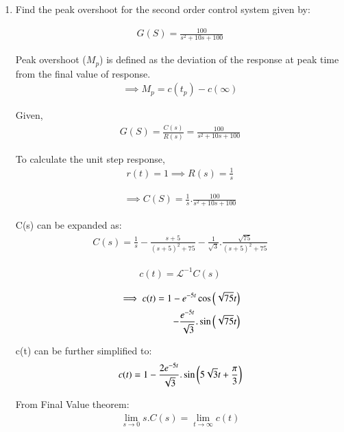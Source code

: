 \begin{enumerate}[label=\thesubsection.\arabic*.,ref=\thesubsection.\theenumi]

\item Find the peak overshoot for the second order control system given by:

\begin{align}
    G(S) = \frac{100}{s^2 + 10s +100}
\end{align}

\solution
Peak overshoot ($M_p$) is defined as the deviation of the response at peak time from the final value of response.
\begin{align}
    \implies M_p = c(t_p) - c(\infty)
    \label{eq:eebtech11045_Mp}
\end{align}

Given,
\begin{align}
    G(S) = \frac{C(s)}{R(s)} = \frac{100}{s^2 + 10s +100}
\end{align}

To calculate the unit step response,
\begin{align}
    r(t) = 1 \implies R(s) = \frac{1}{s}    
\end{align}

\begin{align}
    \implies C(S) = \frac{1}{s}.\frac{100}{s^2 + 10s +100}
\end{align}

C(s) can be expanded as:
\begin{align}
    C(s) = \frac{1}{s} - \frac{s+5}{(s+5)^2 + 75} - \frac{1}{\sqrt{3}}.\frac{\sqrt{75}}{(s+5)^2 + 75}
\end{align}

\begin{align}
    c(t) = \mathcal{L}^{-1}{C(s)}
\end{align}

\begin{align}
    \implies c(t) = 1 - e^{-5t}\cos\left(\sqrt{75}t\right) \\ - \frac{e^{-5t}}{\sqrt{3}}.\sin\left(\sqrt{75}t\right)
\end{align}

c(t) can be further simplified to:
\begin{align}
    c(t) = 1 - \frac{2e^{-5t}}{\sqrt{3}}.\sin \left(5\sqrt{3}t + \frac{\pi}{3}\right)
    \label{eq:eebtech11045_ct}
\end{align}

From Final Value theorem:
\begin{align}
    \lim_{s \to 0} s.C(s) = \lim_{t \to \infty} c(t) 
\end{align}


\end{enumerate}
